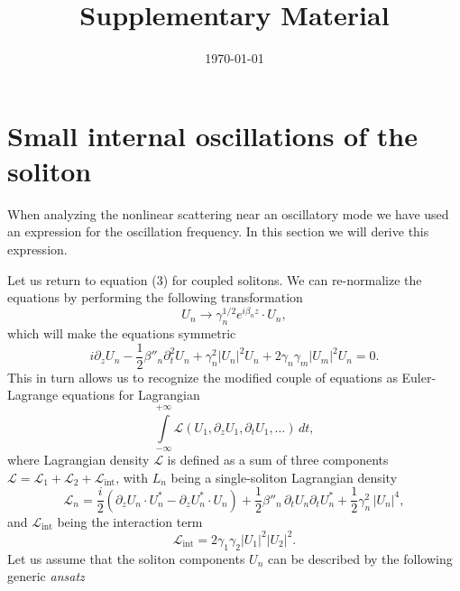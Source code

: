\documentclass[a4paper,11pt]{article}
\title{Supplementary Material}
\date{\today}
\newcommand{\abs}[1]{\left| #1 \right|}
\begin{document}
\maketitle

\section*{Small internal oscillations of the soliton}

When analyzing the nonlinear scattering near an oscillatory mode we have used an expression for the oscillation frequency. In this section we will derive this expression.

Let us return to equation (3) for coupled solitons. We can re-normalize the equations by performing the following transformation
\begin{equation*}
  U_{n} \to \gamma_{n}^{1/2} e^{i \beta_{n} z} \cdot U_{n},
\end{equation*}
which will make the equations symmetric
\begin{equation*}
  i \partial_{z} U_{n}
    - \frac{1}{2} \beta''_{n} \partial_{t}^{2} U_{n}
    + \gamma_{n}^{2} \abs{U_{n}}^{2} U_{n}
    + 2 \gamma_{n} \gamma_{m} \abs{U_{m}}^{2} U_{n} = 0.
\end{equation*}
This in turn allows us to recognize the modified couple of equations as Euler-Lagrange equations for Lagrangian
\begin{equation*}
  \int \limits_{-\infty}^{+\infty}
    \mathcal{L}(U_{1}, \partial_{z} U_{1}, \partial_{t} U_{1}, \ldots)
    \, dt,
\end{equation*}
where Lagrangian density $\mathcal{L}$ is defined as a sum of three components $\mathcal{L} = \mathcal{L}_{1} + \mathcal{L}_{2} + \mathcal{L}_{\text{int}}$, with $L_{n}$ being a single-soliton Lagrangian density
\begin{equation}
  \label{eq:SingleSolitonLagrangianDensity}
  \mathcal{L}_{n} =
  \frac{i}{2} \left(
    \partial_{z} U_{n} \cdot U_{n}^{*} -
    \partial_{z} U_{n}^{*} \cdot U_{n}
  \right)
  + \frac{1}{2} \beta''_{n} \, \partial_{t} U_{n} \partial_{t} U_{n}^{*}
  + \frac{1}{2} \gamma_{n}^{2} \, \abs{U_{n}}^{4},
\end{equation}
and $\mathcal{L}_{\text{int}}$ being the interaction term
\begin{equation}
  \label{eq:InteractionLagrangianDensity}
  \mathcal{L}_{\text{int}} =
    2 \gamma_{1} \gamma_{2}
    \abs{U_{1}}^{2} \abs{U_{2}}^{2}.
\end{equation}
Let us assume that the soliton components $U_{n}$ can be described by the following generic \textit{ansatz}
\end{document}
